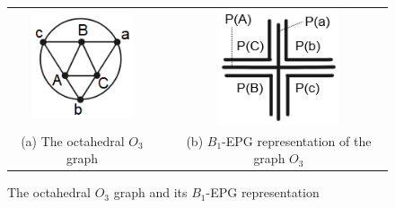 \begin{figure}[h]
  \centering
  
  \begin{tabular}{@{}c@{} p{3cm} @{}c@{} }
    \includegraphics[width=3cm]{./img/octaedro.png} & &\includegraphics[width=3.5cm]{./img/representacaoOctaedro.png}  \\[\abovecaptionskip]
    \footnotesize (a) The octahedral $O_3$ graph  & &  \footnotesize(b) $B_1$-EPG representation of the graph $O_3$
  \end{tabular}
 \caption{The octahedral $O_3$ graph and its  $B_1$-EPG representation}\label{fig:octaedro}
\end{figure}